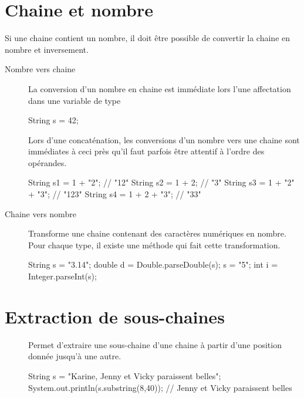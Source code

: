 	
\section{Chaine et nombre}

	Si une chaine contient un nombre, il doit être possible de convertir la
	chaine en nombre et inversement.

	\begin{description}
	
		\item[Nombre vers chaine]			
			La conversion d'un nombre en chaine est immédiate lors l'une
			affectation dans une variable de type 

			\begin{java}
				String s = 42;
			\end{java}

			Lors d'une concaténation, les conversions d'un nombre vers une
			chaine sont immédiates à ceci près qu'il faut parfois être attentif
			à l'ordre des opérandes.

			\begin{java}
				String s1 = 1 + "2";		// "12"
				String s2 = 1 + 2;			// "3"
				String s3 = 1 + "2" + "3";	// "123"
				String s4 = 1 + 2 + "3";	// "33"
			\end{java}

		\item[Chaine vers nombre]
		Transforme une chaine contenant des caractères numériques 
		en nombre. Pour chaque type, il existe une méthode qui fait cette
		transformation. 

		\begin{java}
String s = "3.14";		
double d = Double.parseDouble(s);			
s = "5";
int i = Integer.parseInt(s);
		\end{java}

	\end{description}
	
\section{Extraction de sous-chaines}

	\begin{description}
	\item[]
		
		Permet d’extraire une sous-chaine d'une chaine à partir d'une position
		donnée jusqu'à une autre. 

		\begin{java}
String s = "Karine, Jenny et Vicky paraissent belles";			
System.out.println(s.substring(8,40)); 
	// Jenny et Vicky paraissent belles
		\end{java}
	
	\end{description}


